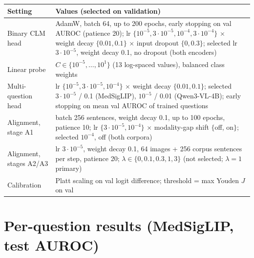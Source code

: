\documentclass[11pt]{article}
\begin{document}
\begin{table}[!h]
  \centering\small
  \begin{tabular}{lp{10.5cm}}
    \toprule
    Setting & Values (selected on validation) \\
    \midrule
    Binary CLM head & AdamW, batch 64, up to 200 epochs, early stopping on val AUROC (patience 20); lr
      $\{10^{-5},3\cdot10^{-5},10^{-4},3\cdot10^{-4}\}$ $\times$ weight decay $\{0.01,0.1\}$ $\times$ input dropout
      $\{0,0.3\}$; selected lr $3\cdot10^{-5}$, weight decay 0.1, no dropout (both encoders) \\
    Linear probe & $C\in\{10^{-5},\dots,10^{1}\}$ (13 log-spaced values), balanced class weights \\
    Multi-question head & lr $\{10^{-5},3\cdot10^{-5},10^{-4}\}$ $\times$ weight decay $\{0.01,0.1\}$; selected
      $3\cdot10^{-5}$ / 0.1 (MedSigLIP), $10^{-5}$ / 0.01 (Qwen3-VL-4B); early stopping on mean val AUROC of trained questions \\
    Alignment, stage A1 & batch 256 sentences, weight decay 0.1, up to 100 epochs, patience 10; lr
      $\{3\cdot10^{-5},10^{-4}\}$ $\times$ modality-gap shift $\{$off, on$\}$; selected $10^{-4}$, off (both corpora) \\
    Alignment, stages A2/A3 & lr $3\cdot10^{-5}$, weight decay 0.1, 64 images + 256 corpus sentences per step,
      patience 20; $\lambda\in\{0,0.1,0.3,1,3\}$ (not selected; $\lambda=1$ primary) \\
    Calibration & Platt scaling on val logit difference; threshold = max Youden $J$ on val \\
    \bottomrule
  \end{tabular}
\end{table}

\clearpage
\section{Per-question results (MedSigLIP, test AUROC)}
\end{document}
